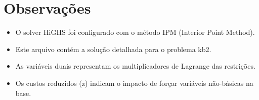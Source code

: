 \documentclass[12pt]{article}
\begin{document}
\section{Observações}

\begin{itemize}
\item O solver HiGHS foi configurado com o método IPM (Interior Point Method).
\item Este arquivo contém a solução detalhada para o problema kb2.
\item As variáveis duais representam os multiplicadores de Lagrange das restrições.
\item Os custos reduzidos (z) indicam o impacto de forçar variáveis não-básicas na base.
\end{itemize}
\end{document}
